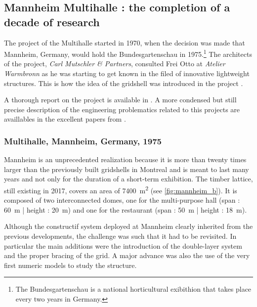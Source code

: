 \subsection{Mannheim Multihalle : the completion of a decade of research}
The project of the Multihalle started in 1970, when the decision was made that Mannheim, Germany, would hold the Bundesgartenschau in 1975.\footnote{The Bundesgartenschau is a national horticultural exibithion that takes place every two years in Germany.} The architects of the project, \emph{Carl Mutschler \& Partners}, consulted Frei Otto at \emph{Atelier Warmbronn} as he was starting to get known in the filed of innovative lightweight structures. This is how the idea of the gridshell was introduced in the project \cite{Liddell2015}. 

A thorough report on the project is available in \cite{IL13}.  A more condensed but still precise description of the engineering problematics related to this projects are availlables in the excellent papers from \citet{Happold1975, Liddell2015}.

\subsubsection{Multihalle, Mannheim, Germany, 1975}
Mannheim is an unprecedented realization because it is more than twenty times larger than the previously built gridshells in Montreal and is meant to last many years and not only for the duration of a short-term exhibition. The timber lattice, still existing in 2017,  covers an area of \SI{7400}{m^2} (see \cref{fig:mannheim_b}). It is composed of two interconnected domes, one for the multi-purpose hall (span : \SI{60}{m} | height : \SI{20}{m}) and one for the restaurant (span : \SI{50}{m} | height : \SI{18}{m}).

Although the constructif system deployed at Mannheim clearly inherited from the previous developments, the challenge was such that it had to be revisited. In particular the main additions were the introduction of the double-layer system and the proper bracing of the grid. A major advance was also the use of the very first numeric models to study the structure. 

